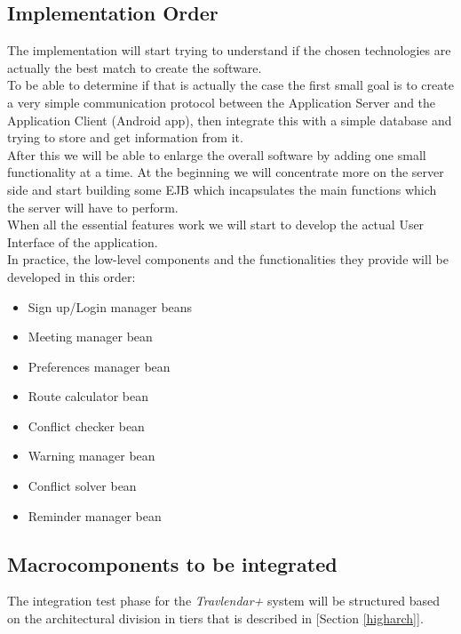 \subsection{Implementation Order}
The implementation will start trying to understand if the chosen technologies are actually the best match to create the software.
\\To be able to determine if that is actually the case the first small goal is to create a very simple communication protocol between the Application Server and the Application Client (Android app), then integrate this with a simple database and trying to store and get information from it.
\\After this we will be able to enlarge the overall software by adding one small functionality at a time. At the beginning we will concentrate more on the server side and start building some EJB which incapsulates the main functions which the server will have to perform.
\\When all the essential features work we will start to develop the actual User Interface of the application.
\\In practice, the low-level components and the functionalities they provide will be developed in this order:
\begin{itemize}
\item Sign up/Login manager beans
\item Meeting manager bean
\item Preferences manager bean
\item Route calculator bean
\item Conflict checker bean
\item Warning manager bean
\item Conflict solver bean
\item Reminder manager bean
\end{itemize}

\subsection{Macrocomponents to be integrated}

The integration test phase for the \emph{Travlendar+} system will be structured based on the architectural division in tiers that is described in [Section \ref{higharch}].

